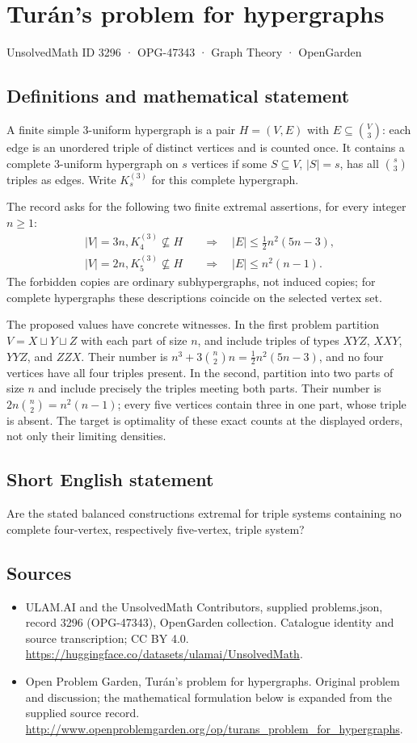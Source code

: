 \documentclass[11pt,a4paper]{article}
\begin{document}
\section*{Turán's problem for hypergraphs}\label{3296}
{\small UnsolvedMath ID 3296 · OPG-47343 · Graph Theory · OpenGarden}
\subsection{Definitions and mathematical statement}
A finite simple 3-uniform hypergraph is a pair $H=(V,E)$ with
$E\subseteq\binom V3$: each edge is an unordered triple of distinct
vertices and is counted once. It contains a complete 3-uniform
hypergraph on $s$ vertices if some $S\subseteq V$, $|S|=s$, has all
$\binom s3$ triples as edges. Write $K_s^{(3)}$ for this complete
hypergraph.

The record asks for the following two finite extremal assertions,
for every integer $n\ge1$:
\[
 \begin{aligned}
 |V|=3n, K_4^{(3)}\not\subseteq H
      &\quad\Longrightarrow\quad |E|\le\tfrac12n^2(5n-3),\\
 |V|=2n, K_5^{(3)}\not\subseteq H
      &\quad\Longrightarrow\quad |E|\le n^2(n-1).
 \end{aligned}
\]
The forbidden copies are ordinary subhypergraphs, not induced copies;
for complete hypergraphs these descriptions coincide on the selected
vertex set.

The proposed values have concrete witnesses. In the first problem
partition $V=X\sqcup Y\sqcup Z$ with each part of size $n$, and include
triples of types $XYZ$, $XXY$, $YYZ$, and $ZZX$. Their number is
$n^3+3\binom n2n=\tfrac12n^2(5n-3)$, and no four vertices have all four
triples present. In the second, partition into two parts of size $n$
and include precisely the triples meeting both parts. Their number
is $2n\binom n2=n^2(n-1)$; every five vertices contain three in one
part, whose triple is absent. The target is optimality of these exact
counts at the displayed orders, not only their limiting densities.
\subsection{Short English statement}
Are the stated balanced constructions extremal for triple systems containing no complete four-vertex, respectively five-vertex, triple system?
\subsection{Sources}
\begin{itemize}
\item[S1] ULAM.AI and the UnsolvedMath Contributors, supplied problems.json, record 3296 (OPG-47343), OpenGarden collection. Catalogue identity and source transcription; CC BY 4.0.
\url{https://huggingface.co/datasets/ulamai/UnsolvedMath}.
\item[S2] Open Problem Garden, Turán's problem for hypergraphs. Original problem and discussion; the mathematical formulation below is expanded from the supplied source record.
\url{http://www.openproblemgarden.org/op/turans_problem_for_hypergraphs}.
\end{itemize}
\end{document}
